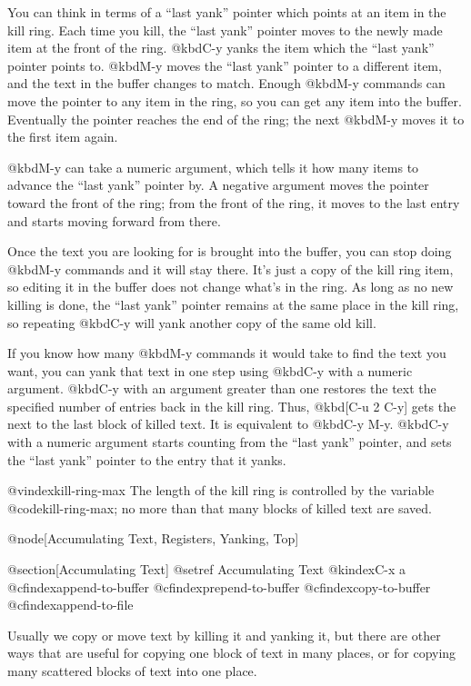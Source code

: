 {{{{{{  You can think in terms of a ``last yank'' pointer which points at an item
in the kill ring.  Each time you kill, the ``last yank'' pointer moves
to the newly made item at the front of the ring.  @kbd{C-y} yanks the
item which the ``last yank'' pointer points to.  @kbd{M-y} moves the ``last
yank'' pointer to a different item, and the text in the buffer changes to
match.  Enough @kbd{M-y} commands can move the pointer to any item in the
ring, so you can get any item into the buffer.  Eventually the pointer
reaches the end of the ring; the next @kbd{M-y} moves it to the first
item again.

  @kbd{M-y} can take a numeric argument, which tells it how many items to
advance the ``last yank'' pointer by.  A negative argument moves the
pointer toward the front of the ring; from the front of the ring,
it moves to the last entry and starts moving forward from there.

  Once the text you are looking for is brought into the buffer, you
can stop doing @kbd{M-y} commands and it will stay there.  It's just a
copy of the kill ring item, so editing it in the buffer does not
change what's in the ring.  As long as no new killing is done, the
``last yank'' pointer remains at the same place in the kill ring, so
repeating @kbd{C-y} will yank another copy of the same old kill.

  If you know how many @kbd{M-y} commands it would take to find the
text you want, you can yank that text in one step using @kbd{C-y} with
a numeric argument.  @kbd{C-y} with an argument greater than one
restores the text the specified number of entries back in the kill
ring.  Thus, @kbd[C-u 2 C-y] gets the next to the last block of killed
text.  It is equivalent to @kbd{C-y M-y}.  @kbd{C-y} with a numeric
argument starts counting from the ``last yank'' pointer, and sets the
``last yank'' pointer to the entry that it yanks.

@vindex{kill-ring-max}
  The length of the kill ring is controlled by the variable
@code{kill-ring-max}; no more than that many blocks of killed text are
saved.

@node[Accumulating Text, Registers, Yanking, Top]

@section[Accumulating Text]
@setref Accumulating Text
@kindex{C-x a}
@cfindex{append-to-buffer}
@cfindex{prepend-to-buffer}
@cfindex{copy-to-buffer}
@cfindex{append-to-file}

  Usually we copy or move text by killing it and yanking it, but
there are other ways that are useful for copying one block of text in
many places, or for copying many scattered blocks of text into one
place.

}}}}}}

